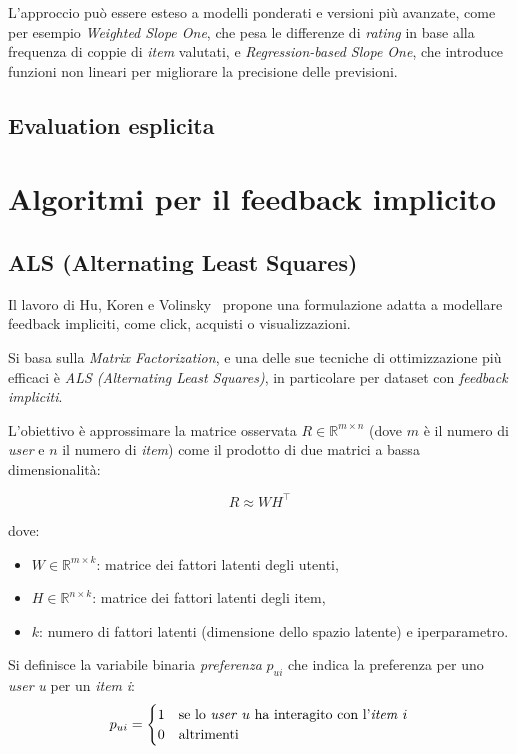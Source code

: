 L'approccio può essere esteso a modelli ponderati e versioni più avanzate, come per esempio \textit{Weighted Slope One}, che pesa le differenze di \textit{rating} in base alla frequenza di coppie di \textit{item} valutati, e \textit{Regression-based Slope One}, che introduce funzioni non lineari per migliorare la precisione delle previsioni.

\subsection{Evaluation esplicita}\label{evaluation-esplicita}

\section{Algoritmi per il feedback implicito}\label{algoritmi-per-feedback-implicito}

\subsection{ALS (Alternating Least Squares)}\label{als}

Il lavoro di Hu, Koren e Volinsky~\cite{ALS} propone una formulazione adatta a modellare feedback impliciti, come click, acquisti o visualizzazioni.

Si basa sulla \textit{Matrix Factorization}, e una delle sue tecniche di ottimizzazione più efficaci è \textit{ALS (Alternating Least Squares)}, in particolare per dataset con \textit{feedback impliciti}.

L'obiettivo è approssimare la matrice osservata $R \in \mathbb{R}^{m \times n}$ (dove $m$ è il numero di \textit{user} e $n$ il numero di \textit{item}) come il prodotto di due matrici a bassa dimensionalità:

\[
R \approx W H^\top
\]

dove:

\begin{itemize}
    \item $W \in \mathbb{R}^{m \times k}$: matrice dei fattori latenti degli utenti,
    \item $H \in \mathbb{R}^{n \times k}$: matrice dei fattori latenti degli item,
    \item $k$: numero di fattori latenti (dimensione dello spazio latente) e iperparametro.
\end{itemize}

Si definisce la variabile binaria \textit{preferenza} $p_{ui}$ che indica la preferenza per uno \textit{user} \textit{u} per un \textit{item} \textit{i}:
\[
p_{ui} =
\begin{cases}
    1 & \text{se lo \textit{user} } u \text{ ha interagito con l'\textit{item} } i \\
    0 & \text{altrimenti}
\end{cases}
\]

